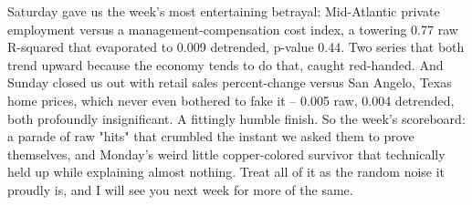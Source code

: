 Saturday gave us the week's most entertaining betrayal: Mid-Atlantic private employment versus a management-compensation cost index, a towering 0.77 raw R-squared that evaporated to 0.009 detrended, p-value 0.44. Two series that both trend upward because the economy tends to do that, caught red-handed. And Sunday closed us out with retail sales percent-change versus San Angelo, Texas home prices, which never even bothered to fake it -- 0.005 raw, 0.004 detrended, both profoundly insignificant. A fittingly humble finish. So the week's scoreboard: a parade of raw "hits" that crumbled the instant we asked them to prove themselves, and Monday's weird little copper-colored survivor that technically held up while explaining almost nothing. Treat all of it as the random noise it proudly is, and I will see you next week for more of the same.
